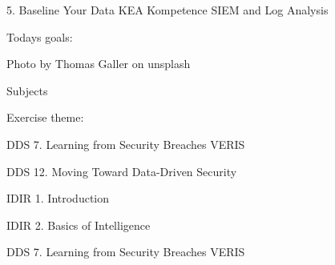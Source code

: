 \documentclass[Screen16to9,17pt]{foils}
\begin{document}
\mytitlepage
{5. Baseline Your Data}
{KEA Kompetence SIEM and Log Analysis}




Todays goals:
\begin{list2}
  \item\end{list2}

  Photo by Thomas Galler on unsplash


\begin{list1}
\item Subjects
\begin{list2}
\item
\end{list2}
\item Exercise theme:
\begin{list2}
\item
\end{list2}
\end{list1}


\begin{list1}
\item DDS 7. Learning from Security Breaches VERIS
\item DDS 12. Moving Toward Data-Driven Security
\item IDIR 1. Introduction
\item IDIR 2. Basics of Intelligence
\end{list1}




\begin{quote}

\end{quote}

\begin{list1}
\item DDS 7. Learning from Security Breaches VERIS
\begin{list2}
\item
\end{list2}
\end{list1}




\begin{quote}

\end{quote}
\end{document}
